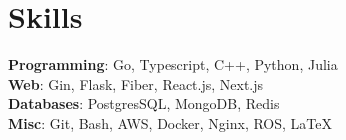 \section*{\sc Skills}
\vspace{-2mm}
\hrulefill
\vspace{1mm}

\textbf{Programming}: Go, Typescript, C++, Python, Julia \\
\textbf{Web}: Gin, Flask, Fiber, React.js, Next.js \\
\textbf{Databases}: PostgresSQL, MongoDB, Redis \\
\textbf{Misc}: Git, Bash, AWS, Docker, Nginx, ROS, \LaTeX \\
